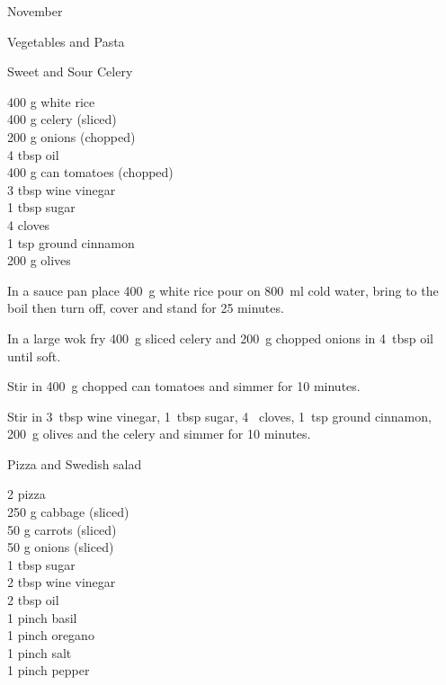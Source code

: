 \begin{menu}{November}
\begin{recipe}{2}{Vegetables and Pasta}
\begin{instructions}
    \end{instructions}
    \end{recipe}%
  
    \begin{recipe}{2}{Sweet and Sour Celery}%
		\begin{ingredients}
		400 g white rice  \\
	400 g celery (sliced) \\
	200 g onions (chopped) \\
	4 tbsp oil  \\
	400 g can tomatoes (chopped) \\
	3 tbsp wine vinegar  \\
	1 tbsp sugar  \\
	4  cloves  \\
	1 tsp ground cinnamon  \\
	200 g olives  \\
	
		\end{ingredients}
	
	
    \begin{instructions}
    \item 
    In a
    sauce pan
    place
    400~g  white rice
    pour on
    800~ml  cold water,
    bring to the boil then turn off, cover and stand for 25 minutes.
  \item 
        In a large wok fry
        400~g sliced celery
        and
        200~g chopped onions
        in
        4~tbsp  oil
        until soft.
      \item 
        Stir in
        400~g chopped can tomatoes
        and simmer for 10 minutes.
      \item 
        Stir in
        3~tbsp  wine vinegar,
        1~tbsp  sugar,
        4~  cloves,
        1~tsp  ground cinnamon,
        200~g  olives
        and the celery
        and simmer for 10 minutes.
      
    \end{instructions}
    \end{recipe}%
  
    \begin{recipe}{1}{Pizza and Swedish salad}%
		\begin{ingredients}
		2  pizza  \\
	250 g cabbage (sliced) \\
	50 g carrots (sliced) \\
	50 g onions (sliced) \\
	1 tbsp sugar  \\
	2 tbsp wine vinegar  \\
	2 tbsp oil  \\
	1 pinch basil  \\
	1 pinch oregano  \\
	1 pinch salt  \\
	1 pinch pepper  \\
	

\end{ingredients}
\end{recipe}
\end{menu}
